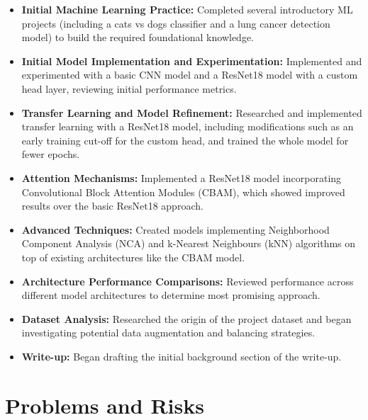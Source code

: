 \documentclass[11pt]{article}
\begin{document}
\begin{itemize}
    \item \textbf{Initial Machine Learning Practice:} Completed several introductory ML projects (including a cats vs dogs classifier and a lung cancer detection model) to build the required foundational knowledge.
    \item \textbf{Initial Model Implementation and Experimentation:} Implemented and experimented with a basic CNN model and a ResNet18 model with a custom head layer, reviewing initial performance metrics.
    \item \textbf{Transfer Learning and Model Refinement:} Researched and implemented transfer learning with a ResNet18 model, including modifications such as an early training cut-off for the custom head, and trained the whole model for fewer epochs.
    \item \textbf{Attention Mechanisms:} Implemented a ResNet18 model incorporating Convolutional Block Attention Modules (CBAM), which showed improved results over the basic ResNet18 approach.
    \item \textbf{Advanced Techniques:} Created models implementing Neighborhood Component Analysis (NCA) and k-Nearest Neighbours (kNN) algorithms on top of existing architectures like the CBAM model.
    \item \textbf{Architecture Performance Comparisons:} Reviewed performance across different model architectures to determine most promising approach.
    \item \textbf{Dataset Analysis:} Researched the origin of the project dataset and began investigating potential data augmentation and balancing strategies.
    \item \textbf{Write-up:} Began drafting the initial background section of the write-up.
\end{itemize}

\section*{Problems and Risks}\label{problems-and-risks}
\end{document}
